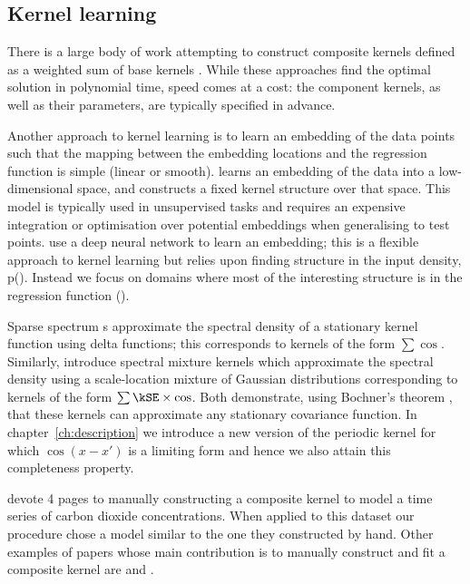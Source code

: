 \subsection{Kernel learning}
There is a large body of work attempting to construct composite kernels defined as a weighted sum of base kernels \citep[e.g.][]{Christoudias2009-an, Bach2009-hr}.
While these approaches find the optimal solution in polynomial time, speed comes at a cost: the component kernels, as well as their parameters, are typically specified in advance.

Another approach to kernel learning is to learn an embedding of the data points such that the mapping between the embedding locations and the regression function is simple (\eg linear or smooth).
\citet{Lawrence2005-cn} learns an embedding of the data into a low-dimensional space, and constructs a fixed kernel structure over that space.
This model is typically used in unsupervised tasks and requires an expensive integration or optimisation over potential embeddings when generalising to test points.
\citet{Salakhutdinov2008-zt} use a deep neural network to learn an embedding; this is a flexible approach to kernel learning but relies upon finding structure in the input density, p().
Instead we focus on domains where most of the interesting structure is in the regression function \function().

Sparse spectrum \gp{}s \citep{Lazaro-gredilla2010-hc} approximate the spectral density of a stationary kernel function using delta functions; this corresponds to kernels of the form $\sum \cos$.
Similarly, \citet{Wilson2013-eq} introduce spectral mixture kernels which approximate the spectral density using a scale-location mixture of Gaussian distributions corresponding to kernels of the form $\sum \kSE \times \cos$.
Both demonstrate, using Bochner's theorem \citep{Bochner1959-yk}, that these kernels can approximate any stationary covariance function.
In chapter~\ref{ch:description} we introduce a new version of the periodic kernel for which $\cos(x-x')$ is a limiting form and hence we also attain this completeness property.

\cite{Rasmussen2006-ml} devote 4 pages to manually constructing a composite kernel to model a time series of carbon dioxide concentrations.
When applied to this dataset our procedure chose a model similar to the one they constructed by hand.
Other examples of papers whose main contribution is to manually construct and fit a composite \gp{} kernel are \cite{Klenske_undated-ys} and \cite{Lloyd2013-yn}.


